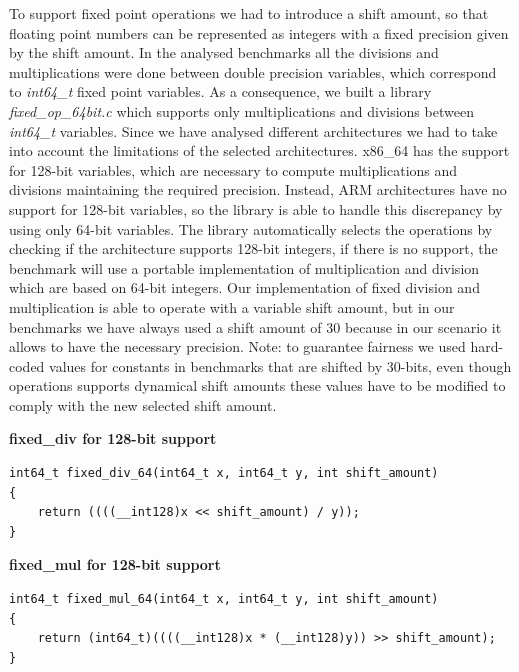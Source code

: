 To support fixed point operations we had to introduce a shift amount, so that floating point numbers can be represented as integers with a fixed precision given by the shift amount.\newline
In the analysed benchmarks all the divisions and multiplications were done between double precision variables, which correspond to \textit{int64\_t} fixed point variables. As a consequence, we built a library \textit{fixed\_op\_64bit.c} which supports only multiplications and divisions between \textit{int64\_t} variables. \newline
Since we have analysed different architectures we had to take into account the limitations of the selected architectures.\newline
x86\_64 has the support for 128-bit variables, which are necessary to compute multiplications and divisions maintaining the required precision. Instead, ARM architectures have no support for 128-bit variables, so the library is able to handle this discrepancy by using only 64-bit variables.
The library automatically selects the operations by checking if the architecture supports 128-bit integers, if there is no support, the benchmark will use a portable implementation of multiplication and division which are based on 64-bit integers.\newline
Our implementation of fixed division and multiplication is able to operate with a variable shift amount, but in our benchmarks we have always used a shift amount of 30 because in our scenario it allows to have the necessary precision.\newline
Note: to guarantee fairness we used hard-coded values for constants in benchmarks that are shifted by 30-bits, even though operations supports dynamical shift amounts these values have to be modified to comply with the new selected shift amount.\newline

\textbf{fixed\_div for 128-bit support}

\begin{lstlisting}
int64_t fixed_div_64(int64_t x, int64_t y, int shift_amount)
{
    return ((((__int128)x << shift_amount) / y));
}
\end{lstlisting}

\textbf{fixed\_mul for 128-bit support}

\begin{lstlisting}
int64_t fixed_mul_64(int64_t x, int64_t y, int shift_amount)
{
	return (int64_t)((((__int128)x * (__int128)y)) >> shift_amount);
}
\end{lstlisting}

